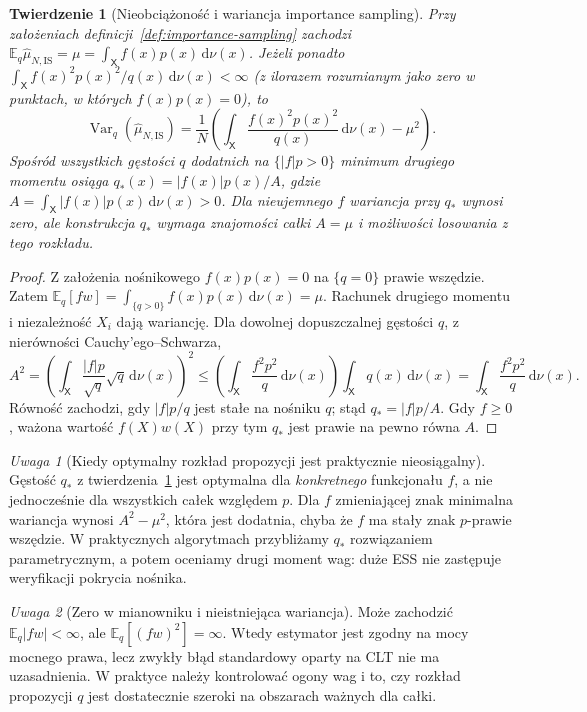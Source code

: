 \documentclass[11pt,a4paper,oneside]{report}
\numberwithin{equation}{chapter}
\theoremstyle{plain}
\newtheorem{twierdzenie}{Twierdzenie}[chapter]
\theoremstyle{definition}
\theoremstyle{remark}
\newtheorem{uwaga}{Uwaga}[chapter]
\newcommand{\E}{\mathbb E}
\newcommand{\Var}{\operatorname{Var}}
\newcommand{\dd}{\mathrm d}
\begin{document}
\begin{twierdzenie}[Nieobciążoność i wariancja importance sampling]
\label{thm:is-variance}
Przy założeniach definicji~\ref{def:importance-sampling} zachodzi
$\E_q\widehat\mu_{N,\mathrm{IS}}=\mu=
\int_{\mathsf X}f(x)p(x)\,\dd\nu(x)$.
Jeżeli ponadto
$\int_{\mathsf X}f(x)^2p(x)^2/q(x)\,\dd\nu(x)<\infty$
(z ilorazem rozumianym jako zero w punktach, w których $f(x)p(x)=0$), to
\[
 \Var_q(\widehat\mu_{N,\mathrm{IS}})=\frac1N
 \left(\int_{\mathsf X}\frac{f(x)^2p(x)^2}{q(x)}\,
       \dd\nu(x)-\mu^2\right).
\]
Spośród wszystkich gęstości $q$ dodatnich na $\{|f|p>0\}$
minimum drugiego momentu osiąga $q_*(x)=|f(x)|p(x)/A$,
gdzie $A=\int_{\mathsf X}|f(x)|p(x)\,\dd\nu(x)>0$.
Dla nieujemnego $f$ wariancja przy $q_*$ wynosi zero,
\emph{ale} konstrukcja $q_*$ wymaga znajomości całki $A=\mu$
i możliwości losowania z tego rozkładu.
\end{twierdzenie}
\begin{proof}
Z założenia nośnikowego $f(x)p(x)=0$ na $\{q=0\}$
prawie wszędzie. Zatem
$\E_q[fw]=\int_{\{q>0\}} f(x)p(x)\,\dd\nu(x)=\mu$.
Rachunek drugiego momentu i niezależność $X_i$ dają wariancję.
Dla dowolnej dopuszczalnej gęstości $q$, z nierówności
Cauchy'ego--Schwarza,
\[
 A^2=\left(\int_{\mathsf X}
       \frac{|f|p}{\sqrt q}\sqrt q\,\dd\nu(x)\right)^2
 \le\left(\int_{\mathsf X}\frac{f^2p^2}{q}\,\dd\nu(x)\right)
       \int_{\mathsf X}q(x)\,\dd\nu(x)
 =\int_{\mathsf X}\frac{f^2p^2}{q}\,\dd\nu(x).
\]
Równość zachodzi, gdy $|f|p/q$ jest stałe na nośniku $q$;
stąd $q_*=|f|p/A$. Gdy $f\ge0$, ważona wartość
$f(X)w(X)$ przy tym $q_*$ jest prawie na pewno równa $A$.
\end{proof}

\begin{uwaga}[Kiedy optymalny rozkład propozycji jest praktycznie nieosiągalny]
Gęstość $q_*$ z twierdzenia~\ref{thm:is-variance} jest optymalna dla
\emph{konkretnego} funkcjonału $f$, a nie jednocześnie dla wszystkich
całek względem $p$. Dla $f$ zmieniającej znak minimalna wariancja
wynosi $A^2-\mu^2$, która jest dodatnia, chyba że $f$ ma stały znak
$p$-prawie wszędzie. W praktycznych algorytmach przybliżamy $q_*$
rozwiązaniem parametrycznym, a potem oceniamy drugi moment wag:
duże ESS nie zastępuje weryfikacji pokrycia nośnika.
\end{uwaga}

\begin{uwaga}[Zero w mianowniku i nieistniejąca wariancja]
Może zachodzić $\E_q|fw|<\infty$, ale
$\E_q[(fw)^2]=\infty$. Wtedy estymator jest zgodny
na mocy mocnego prawa, lecz zwykły błąd standardowy
oparty na CLT nie ma uzasadnienia. W praktyce należy
kontrolować ogony wag i to, czy rozkład propozycji
$q$ jest dostatecznie szeroki na obszarach ważnych dla całki.
\end{uwaga}
\end{document}
